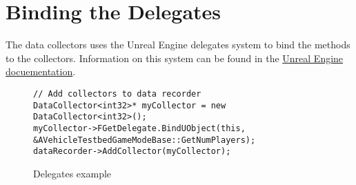\documentclass[../main.tex]{subfiles}
\begin{document}
\section{Binding the Delegates}
The data collectors uses the Unreal Engine delegates system to bind the methods to the collectors. Information on this system can be found in the \href{https://docs.unrealengine.com/en-US/Programming/UnrealArchitecture/Delegates}{Unreal Engine docuementation}.

\begin{figure}[H]
  \begin{lstlisting}
// Add collectors to data recorder
DataCollector<int32>* myCollector = new DataCollector<int32>();
myCollector->FGetDelegate.BindUObject(this, &AVehicleTestbedGameModeBase::GetNumPlayers);
dataRecorder->AddCollector(myCollector);
  \end{lstlisting}
  \caption{Delegates example}
\end{figure}
\end{document}
